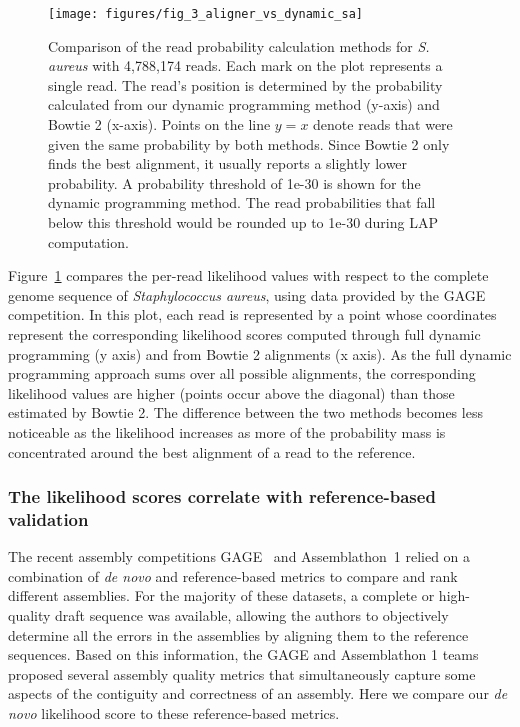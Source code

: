 \documentclass[12pt,\mydriver]{thesis}
\begin{document}
\begin{figure}[h!]
\begin{center}
\texttt{[image: figures/fig\_3\_aligner\_vs\_dynamic\_sa]}
\end{center}
\renewcommand{\baselinestretch}{1}
\small\normalsize
\begin{quote}
\caption[Comparison of the read probability calculation methods]{Comparison of the read probability calculation methods for
    \emph{S. aureus} with 4,788,174 reads. Each mark on the plot
    represents a single read.  The read's position is determined by
    the probability calculated from our dynamic programming method (y-axis)
    and Bowtie 2 (x-axis).  Points on the line $y=x$ denote reads that were
    given the same probability by both methods.  Since Bowtie 2 only
    finds the best alignment, it usually reports a slightly lower
    probability.  A probability threshold of 1e-30 is shown for the
    dynamic programming method.  The read probabilities that fall below
    this threshold would be rounded up to 1e-30 during LAP computation.}
\label{fig:aligner_vs_dynamic}
\end{quote}
\end{figure}
\renewcommand{\baselinestretch}{2}
\small\normalsize

Figure~\ref{fig:aligner_vs_dynamic} compares the per-read likelihood
values with respect to the complete genome sequence of
\emph{Staphylococcus aureus}, using data provided by the GAGE
competition.  In this plot, each read is represented by a point whose
coordinates represent the corresponding likelihood scores computed
through full dynamic programming (y axis) and from Bowtie 2 alignments
(x axis). As the full dynamic programming approach sums over all
possible alignments, the corresponding likelihood values are higher
(points occur above the diagonal) than those estimated by Bowtie 2.
The difference between the two methods becomes less noticeable as the
likelihood increases as more of the probability mass is concentrated
around the best alignment of a read to the reference.

\subsubsection{The likelihood scores correlate with reference-based
  validation}

The recent assembly competitions GAGE~\cite{salzberg2011gage} and Assemblathon~1
\cite{earl2011assemblathon} relied on a combination of \emph{de novo} and
reference-based metrics to compare and rank different assemblies. For
the majority of these datasets, a complete or high-quality draft
sequence was available, allowing the authors to objectively determine
all the errors in the assemblies by aligning them to the reference
sequences. Based on this information, the GAGE and Assemblathon 1
teams proposed several assembly quality metrics that simultaneously
capture some aspects of the contiguity and correctness of an assembly.  Here we
compare our \emph{de novo} likelihood score to these reference-based
metrics.
\end{document}
